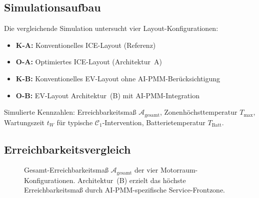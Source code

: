 ﻿\documentclass[12pt,a4paper]{article}
\begin{document}
\subsection{Simulationsaufbau}

Die vergleichende Simulation untersucht vier Layout-Konfigurationen:

\begin{itemize}[leftmargin=*]
	\item \textbf{K-A:} Konventionelles ICE-Layout (Referenz)
	\item \textbf{O-A:} Optimiertes ICE-Layout (Architektur~A)
	\item \textbf{K-B:} Konventionelles EV-Layout ohne AI-PMM-Berücksichtigung
	\item \textbf{O-B:} EV-Layout Architektur~(B) mit AI-PMM-Integration
\end{itemize}

Simulierte Kennzahlen: Erreichbarkeitsmaß $\mathcal{A}_\mathrm{gesamt}$,
Zonenhöchsttemperatur $T_\mathrm{max}$, Wartungszeit $t_W$ für typische
$\mathcal{C}_1$-Intervention, Batterietemperatur $T_\mathrm{Batt}$.

\subsection{Erreichbarkeitsvergleich}

\begin{figure}[H]
	\centering
	\caption{Gesamt-Erreichbarkeitsmaß $\mathcal{A}_\mathrm{gesamt}$ der vier
		Motorraum-Konfigurationen. Architektur~(B) erzielt das höchste Erreichbarkeitsmaß
		durch AI-PMM-spezifische Service-Frontzone.}
	\label{fig:erreichbarkeit_vergleich}
\end{figure}
\end{document}
